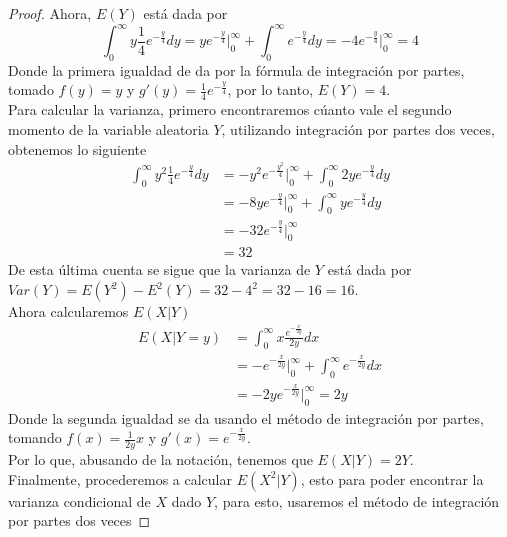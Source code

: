 \documentclass[10pt,a4paper]{article}
\theoremstyle{plain}
\theoremstyle{definition}
\theoremstyle{remark}
\newenvironment{solucion}{\renewcommand{\proofname}{Solución}\renewcommand{\qedsymbol}{}\begin{proof}}{\end{proof}}
\begin{document}
\begin{enumerate}
\begin{solucion}
    Ahora, $E(Y)$ está dada por
    \begin{equation*}
        \int_{0}^{\infty} y\frac{1}{4} e^{-\frac{y}{4}}dy = y e^{-\frac{y}{4}}\vert_{0}^{\infty} + \int_{0}^{\infty} e^{-\frac{y}{4}}dy = -4 e^{-\frac{y}{4}}\vert_{0}^{\infty} = 4
    \end{equation*}
    Donde la primera igualdad de da por la fórmula de integración por partes, tomado $f(y) = y$ y $g'(y) = \frac{1}{4} e^{-\frac{y}{4}}$, por lo tanto, $E(Y) = 4$.\\
    Para calcular la varianza, primero encontraremos cúanto vale el segundo momento de la variable aleatoria $Y$, utilizando integración por partes dos veces, obtenemos lo siguiente
    \begin{equation*}
        \begin{split}
            \int_{0}^{\infty}y^2 \frac{1}{4} e^{-\frac{y}{4}} dy & = -y^2 e^{-\frac{y^2}{4}}\vert_{0}^{\infty} + \int_{0}^{\infty} 2y e^{-\frac{y}{4}}dy \\
            & = -8y e^{-\frac{y}{4}}\vert_{0}^{\infty} + \int_{0}^{\infty} y e^{-\frac{y}{4}}dy \\
            & = -32 e^{-\frac{y}{4}}\vert_{0}^{\infty} \\
            & = 32
        \end{split}
    \end{equation*}
    De esta última cuenta se sigue que la varianza de $Y$ está dada por $Var(Y) = E(Y^2) - E^2 (Y) = 32 - 4^2 = 32 - 16 = 16$.\\
    Ahora calcularemos $E(X \vert Y)$
    \begin{equation*}
    \begin{split}
        E(X|Y = y) & = \int_{0}^{\infty} x \frac{e^{-\frac{x}{2y}}}{2y} dx \\
        & = -e^{-\frac{x}{2y}}\vert_{0}^{\infty} + \int_{0}^{\infty} e^{-\frac{x}{2y}}dx \\
        & = -2y e^{-\frac{x}{2y}}\vert_{0}^{\infty} = 2y
    \end{split}
    \end{equation*}
    Donde la segunda igualdad se da usando el método de integración por partes, tomando $f(x) = \frac{1}{2y}x$ y $g'(x) = e^{-\frac{x}{2y}}$.\\
    Por lo que, abusando de la notación, tenemos que $E(X|Y) = 2Y$.\\
    Finalmente, procederemos a calcular $E(X^2 | Y)$, esto para poder encontrar la varianza condicional de $X$ dado $Y$, para esto, usaremos el método de integración por partes dos veces

\end{solucion}
\end{enumerate}
\end{document}

